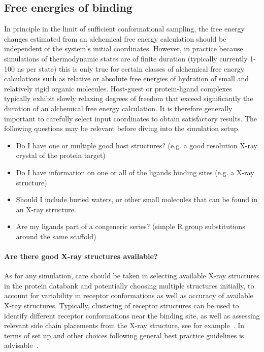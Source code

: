 \documentclass[9pt,bestpractices]{livecoms}
\begin{document}
\subsection*{Free energies of binding}
In principle in the limit of sufficient conformational sampling, the free energy changes estimated from an alchemical free energy calculation should be independent of the system's initial coordinates. However, in practice because simulations of thermodynamic states are of finite duration (typically currently 1-100 ns per state) this is only true for certain classes of alchemical free energy calculations such as relative or absolute free energies of hydration of small and relatively rigid organic molecules. Host-guest or protein-ligand complexes typically exhibit slowly relaxing degrees of freedom that exceed significantly the duration of an alchemical free energy calculation. It is therefore generally important to carefully select input coordinates to obtain satisfactory results. 
The following questions may be relevant before diving into the simulation setup. 
\begin{itemize}
    \item Do I have one or multiple good host structures? (e.g. a good resolution X-ray crystal of the protein target)
    \item Do I have information on one or all of the ligands binding sites (e.g. a X-ray structure)
    \item Should I include buried waters, or other small molecules that can be found in an X-ray structure.
    \item Are my ligands part of a congeneric series? (simple R group substitutions around the same scaffold)
    \end{itemize}

\paragraph{Are there good X-ray structures available?}
As for any simulation, care should be taken in selecting available X-ray structures in the protein databank and potentially choosing multiple structures initially, to account for variability in receptor conformations as well as accuracy of available X-ray structures. Typically, clustering of receptor structures can be used to identify different receptor conformations near the binding site, as well as assessing relevant side chain placements from the X-ray structure, see for example~\cite{mey2016blinded}. In terms of set up and other choices following general best practice guidelines is advisable~\cite{braun2018best}.
\end{document}
